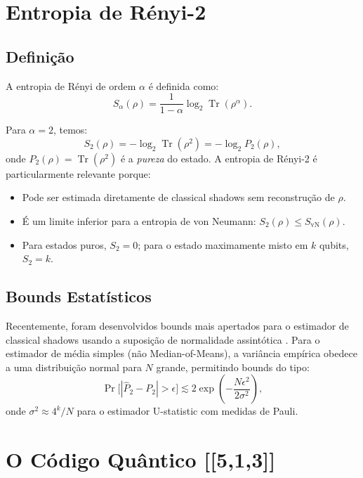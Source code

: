 \documentclass[12pt,a4paper,oneside]{book}
\theoremstyle{definition}
\theoremstyle{remark}
\DeclareMathOperator{\Tr}{Tr}
\begin{document}
\section{Entropia de Rényi-2}

\subsection{Definição}

A entropia de Rényi de ordem $\alpha$ é definida como:
\begin{equation}
    S_\alpha(\rho) = \frac{1}{1-\alpha} \log_2 \Tr(\rho^\alpha).
\end{equation}

Para $\alpha = 2$, temos:
\begin{equation}\label{eq:renyi2}
    S_2(\rho) = -\log_2 \Tr(\rho^2) = -\log_2 P_2(\rho),
\end{equation}
onde $P_2(\rho) = \Tr(\rho^2)$ é a \textit{pureza} do estado. A entropia de Rényi-2 é particularmente relevante porque:
\begin{itemize}
    \item Pode ser estimada diretamente de classical shadows sem reconstrução de $\rho$.
    \item É um limite inferior para a entropia de von Neumann: $S_2(\rho) \leq S_{\text{vN}}(\rho)$.
    \item Para estados puros, $S_2 = 0$; para o estado maximamente misto em $k$ qubits, $S_2 = k$.
\end{itemize}

\subsection{Bounds Estatísticos}

Recentemente, foram desenvolvidos bounds mais apertados para o estimador de classical shadows usando a suposição de normalidade assintótica \cite{fitzsimons2025classical}. Para o estimador de média simples (não Median-of-Means), a variância empírica obedece a uma distribuição normal para $N$ grande, permitindo bounds do tipo:
\begin{equation}
    \Pr\bigl[|\widehat{P}_2 - P_2| > \epsilon\bigr] \lesssim 2\exp\!\left(-\frac{N\epsilon^2}{2\sigma^2}\right),
\end{equation}
onde $\sigma^2 \approx 4^k/N$ para o estimador U-statistic com medidas de Pauli.

\section{O Código Quântico [[5,1,3]]}
\end{document}
